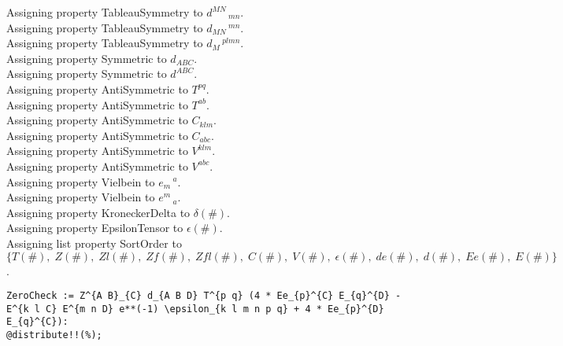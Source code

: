 \documentclass[11pt]{article}
\begin{document}
Assigning property TableauSymmetry to ${d}^{M N}\,_{m n}$.
\\
Assigning property TableauSymmetry to ${d}_{M N}\,^{m n}$.
\\
Assigning property TableauSymmetry to ${d}_{M}\,^{p l m n}$.
\\
Assigning property Symmetric to ${d}_{A B C}$.
\\
Assigning property Symmetric to ${d}^{A B C}$.
\\
Assigning property AntiSymmetric to ${T}^{p q}$.
\\
Assigning property AntiSymmetric to ${T}^{a b}$.
\\
Assigning property AntiSymmetric to ${C}_{k l m}$.
\\
Assigning property AntiSymmetric to ${C}_{a b c}$.
\\
Assigning property AntiSymmetric to ${V}^{k l m}$.
\\
Assigning property AntiSymmetric to ${V}^{a b c}$.
\\
Assigning property Vielbein to ${e}_{m}\,^{a}$.
\\
Assigning property Vielbein to ${e}^{m}\,_{a}$.
\\
Assigning property KroneckerDelta to $\delta(\#)$.
\\
Assigning property EpsilonTensor to $\epsilon(\#)$.
\\
Assigning list property SortOrder to $\{T(\#),\; Z(\#),\; Zl(\#),\; Zf(\#),\; Zfl(\#),\; C(\#),\; V(\#),\; \epsilon(\#),\; de(\#),\; d(\#),\; Ee(\#),\; E(\#)\}$.
\\
{\color[named]{Blue}\begin{verbatim}
ZeroCheck := Z^{A B}_{C} d_{A B D} T^{p q} (4 * Ee_{p}^{C} E_{q}^{D} - E^{k l C} E^{m n D} e**(-1) \epsilon_{k l m n p q} + 4 * Ee_{p}^{D} E_{q}^{C}):
@distribute!!(%);
\end{verbatim}}
\end{document}
